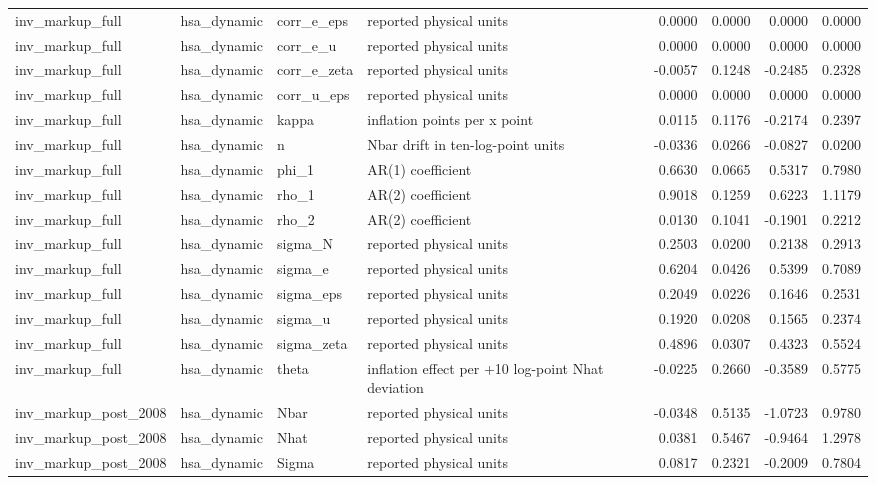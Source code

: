 \begin{tabular}{llllrrrr}
inv\_markup\_full & hsa\_dynamic & corr\_e\_eps & reported physical units & 0.0000 & 0.0000 & 0.0000 & 0.0000 \\
inv\_markup\_full & hsa\_dynamic & corr\_e\_u & reported physical units & 0.0000 & 0.0000 & 0.0000 & 0.0000 \\
inv\_markup\_full & hsa\_dynamic & corr\_e\_zeta & reported physical units & -0.0057 & 0.1248 & -0.2485 & 0.2328 \\
inv\_markup\_full & hsa\_dynamic & corr\_u\_eps & reported physical units & 0.0000 & 0.0000 & 0.0000 & 0.0000 \\
inv\_markup\_full & hsa\_dynamic & kappa & inflation points per x point & 0.0115 & 0.1176 & -0.2174 & 0.2397 \\
inv\_markup\_full & hsa\_dynamic & n & Nbar drift in ten-log-point units & -0.0336 & 0.0266 & -0.0827 & 0.0200 \\
inv\_markup\_full & hsa\_dynamic & phi\_1 & AR(1) coefficient & 0.6630 & 0.0665 & 0.5317 & 0.7980 \\
inv\_markup\_full & hsa\_dynamic & rho\_1 & AR(2) coefficient & 0.9018 & 0.1259 & 0.6223 & 1.1179 \\
inv\_markup\_full & hsa\_dynamic & rho\_2 & AR(2) coefficient & 0.0130 & 0.1041 & -0.1901 & 0.2212 \\
inv\_markup\_full & hsa\_dynamic & sigma\_N & reported physical units & 0.2503 & 0.0200 & 0.2138 & 0.2913 \\
inv\_markup\_full & hsa\_dynamic & sigma\_e & reported physical units & 0.6204 & 0.0426 & 0.5399 & 0.7089 \\
inv\_markup\_full & hsa\_dynamic & sigma\_eps & reported physical units & 0.2049 & 0.0226 & 0.1646 & 0.2531 \\
inv\_markup\_full & hsa\_dynamic & sigma\_u & reported physical units & 0.1920 & 0.0208 & 0.1565 & 0.2374 \\
inv\_markup\_full & hsa\_dynamic & sigma\_zeta & reported physical units & 0.4896 & 0.0307 & 0.4323 & 0.5524 \\
inv\_markup\_full & hsa\_dynamic & theta & inflation effect per +10 log-point Nhat deviation & -0.0225 & 0.2660 & -0.3589 & 0.5775 \\
inv\_markup\_post\_2008 & hsa\_dynamic & Nbar & reported physical units & -0.0348 & 0.5135 & -1.0723 & 0.9780 \\
inv\_markup\_post\_2008 & hsa\_dynamic & Nhat & reported physical units & 0.0381 & 0.5467 & -0.9464 & 1.2978 \\
inv\_markup\_post\_2008 & hsa\_dynamic & Sigma & reported physical units & 0.0817 & 0.2321 & -0.2009 & 0.7804 \\

\end{tabular}
